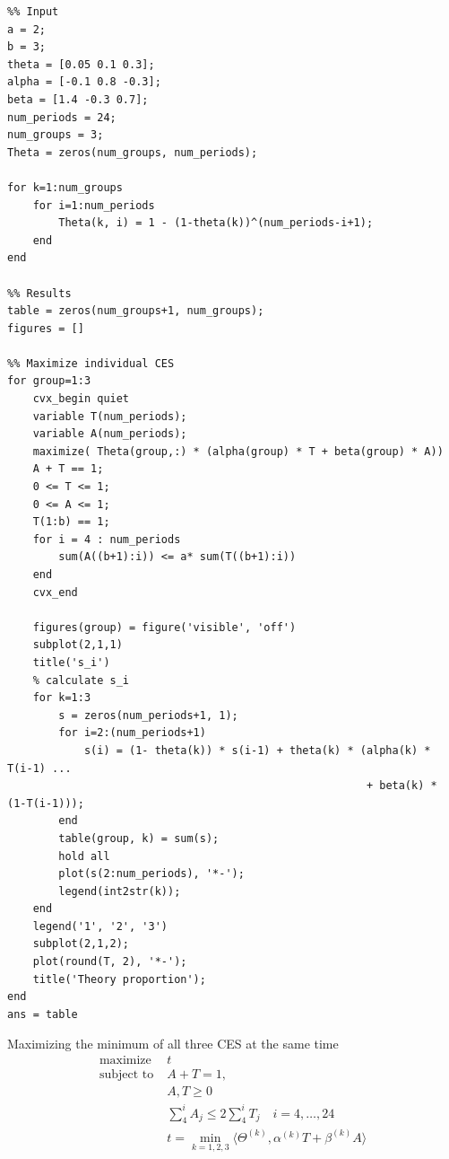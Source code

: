 \documentclass[11pt]{article}
\begin{document}
\begin{verbatim}
%% Input
a = 2;
b = 3;
theta = [0.05 0.1 0.3];
alpha = [-0.1 0.8 -0.3];
beta = [1.4 -0.3 0.7];
num_periods = 24;
num_groups = 3;
Theta = zeros(num_groups, num_periods);

for k=1:num_groups
    for i=1:num_periods
        Theta(k, i) = 1 - (1-theta(k))^(num_periods-i+1);
    end
end

%% Results
table = zeros(num_groups+1, num_groups);
figures = []

%% Maximize individual CES
for group=1:3
    cvx_begin quiet
    variable T(num_periods);
    variable A(num_periods);
    maximize( Theta(group,:) * (alpha(group) * T + beta(group) * A))
    A + T == 1;
    0 <= T <= 1;
    0 <= A <= 1;
    T(1:b) == 1;
    for i = 4 : num_periods
        sum(A((b+1):i)) <= a* sum(T((b+1):i))
    end
    cvx_end

    figures(group) = figure('visible', 'off')
    subplot(2,1,1)
    title('s_i')
    % calculate s_i
    for k=1:3
        s = zeros(num_periods+1, 1);
        for i=2:(num_periods+1)
            s(i) = (1- theta(k)) * s(i-1) + theta(k) * (alpha(k) * T(i-1) ...
                                                        + beta(k) * (1-T(i-1)));
        end
        table(group, k) = sum(s);
        hold all
        plot(s(2:num_periods), '*-');
        legend(int2str(k));
    end
    legend('1', '2', '3')
    subplot(2,1,2);
    plot(round(T, 2), '*-');
    title('Theory proportion');
end
ans = table
\end{verbatim}



Maximizing the minimum of  all three CES at the same time
\begin{align}
  \text{maximize} \; & t \\
  \text{subject to} \; & A + T = 1,
  \\& A, T \ge 0
  \\& \sum_4^i A_j \le  2 \sum_4^i T_j \quad i = 4, \ldots, 24
  \\& t = \min_{k = 1, 2, 3} \langle \Theta^{(k)}, \alpha^{(k)} T + \beta^{(k)} A \rangle 
\end{align}
\end{document}
